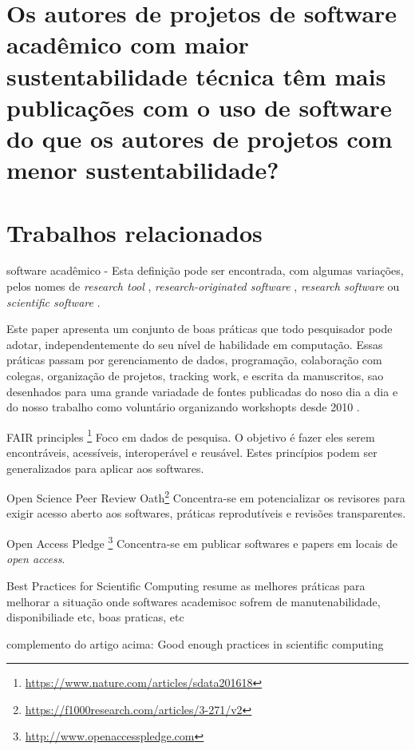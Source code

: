\section{Os autores de projetos de software acadêmico com maior sustentabilidade técnica têm mais publicações com o uso de software do que os autores de projetos com menor sustentabilidade?}




\section{Trabalhos relacionados}

software acadêmico - Esta definição pode ser encontrada, com algumas variações, pelos nomes de
{\it research tool} \cite{Portillo12},
{\it research-originated software} \cite{Kon2011},
{\it research software} \cite{hettrick2014uk} ou
{\it scientific software} \cite{segal2008developing}.

Este paper
apresenta um conjunto de boas práticas que todo pesquisador pode adotar,
independentemente do seu nível de habilidade em computação. Essas práticas
passam por gerenciamento de dados, programação, colaboração com colegas,
organização de projetos, tracking work, e escrita da manuscritos, sao
desenhados para uma grande variadade de fontes publicadas do noso dia a dia e
do nosso trabalho como voluntário organizando workshopts desde 2010
\cite{wilson2017good}.

FAIR principles \cite{wilkinson2016fair}\footnote{\url{https://www.nature.com/articles/sdata201618}}
Foco em dados de pesquisa. O objetivo é fazer eles serem encontráveis,
acessíveis, interoperável e reusável. Estes princípios podem ser
generalizados para aplicar aos softwares.

Open Science Peer Review Oath\footnote{\url{https://f1000research.com/articles/3-271/v2}}
Concentra-se em potencializar os revisores para exigir acesso aberto aos
softwares, práticas reprodutíveis e revisões transparentes.

Open Access Pledge \cite{holcombe2011openaccess}\footnote{\url{http://www.openaccesspledge.com}}
Concentra-se em publicar softwares e papers em locais de {\it open access}.

Best Practices for Scientific Computing \cite{wilson2014best}
resume as melhores práticas para melhorar a situação onde softwares
academisoc sofrem de manutenabilidade, disponibiliade etc, boas praticas, etc

complemento do artigo acima: 
Good enough practices in scientific computing \cite{wilson2017good}


